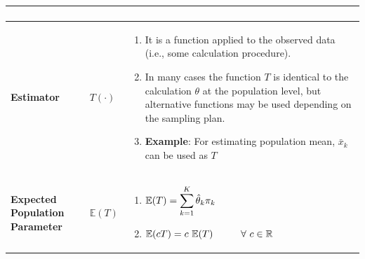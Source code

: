\begin{customArrayStretch}{1.3}
\begin{longtable}{>{\RaggedRight\arraybackslash}p{4cm} >{\centering\arraybackslash}p{0.5cm} p{10.5cm}}
\begin{minipage}{10.3cm}
\begin{enumerate}
        \end{enumerate}
        \vspace{0.15cm}
    \end{minipage} 
    \\ \hline

\textbf{Estimator} &
    $T(\cdot)$ &
    \begin{minipage}{10.3cm}
        \vspace{0.15cm}
        \begin{enumerate}
            \item It is a function applied to the observed data (i.e., some calculation procedure). 
            \hfill \cite{statistics/book/Statistics-for-Data-Scientists/Maurits-Kaptein}

            \item In many cases the function $T$ is identical to the calculation $\theta$ at the population level, but alternative functions may be used depending on the sampling plan.
            \hfill \cite{statistics/book/Statistics-for-Data-Scientists/Maurits-Kaptein}

            \item \textbf{Example}: For estimating population mean, $\bar{x}_k$ can be used as $T$ 
            \hfill \cite{statistics/book/Statistics-for-Data-Scientists/Maurits-Kaptein}
        \end{enumerate}
        \vspace{0.15cm}
    \end{minipage} 
    \\ \hline

\textbf{Expected Population Parameter} &
    $\mathbb{E}(T)$ &
    \begin{minipage}{10.3cm}
        \vspace{0.15cm}
        \begin{enumerate}
            \item $
                \mathbb{E}(T)
                = \displaystyle\sum_{k=1}^{K} \hat{\theta}_k \pi_k
            $
            \hfill \cite{statistics/book/Statistics-for-Data-Scientists/Maurits-Kaptein}

            \item $
                \mathbb{E}(cT) = c\ \mathbb{E}(T)
                \hspace{1cm} \forall\  c \in \mathbb{R}
            $
            \hfill \cite{statistics/book/Statistics-for-Data-Scientists/Maurits-Kaptein}

        \end{enumerate}
        \vspace{0.15cm}
    \end{minipage} 
    \\ \hline



\end{longtable}
\end{customArrayStretch}
